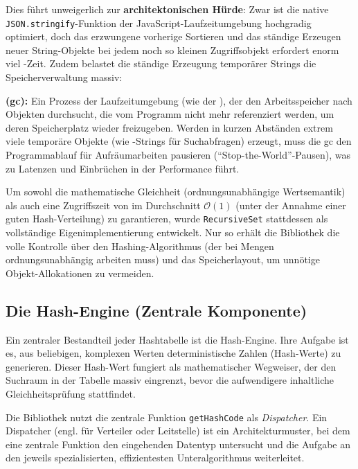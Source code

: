 Dies führt unweigerlich zur \textbf{architektonischen Hürde}: Zwar ist die native \texttt{JSON.stringify}-Funktion der JavaScript-Laufzeitumgebung hochgradig optimiert, doch das erzwungene vorherige Sortieren und das ständige Erzeugen neuer String-Objekte bei jedem noch so kleinen Zugriffsobjekt erfordert enorm viel -Zeit. Zudem belastet die ständige Erzeugung temporärer Strings die Speicherverwaltung massiv:

\begin{definition}
\label{def:garbage-collection}
\textbf{ (\gls{gc}):} Ein Prozess der Laufzeitumgebung (wie der ), der den Arbeitsspeicher nach Objekten durchsucht, die vom Programm nicht mehr referenziert werden, um deren Speicherplatz wieder freizugeben. Werden in kurzen Abständen extrem viele temporäre Objekte (wie -Strings für Suchabfragen) erzeugt, muss die \gls{gc} den Programmablauf für Aufräumarbeiten pausieren (\enquote{Stop-the-World}-Pausen), was zu Latenzen und Einbrüchen in der Performance führt.
\end{definition}

Um sowohl die mathematische Gleichheit (ordnungsunabhängige Wertsemantik) als auch eine Zugriffszeit von im Durchschnitt  $\mathcal{O}(1)$ (unter der Annahme einer guten Hash-Verteilung) zu garantieren, wurde \texttt{RecursiveSet} stattdessen als vollständige Eigenimplementierung entwickelt. Nur so erhält die Bibliothek die volle Kontrolle über den Hashing-Algorithmus (der bei Mengen ordnungsunabhängig arbeiten muss) und das Speicherlayout, um unnötige Objekt-Allokationen zu vermeiden.

\subsection{Die Hash-Engine (Zentrale Komponente)}
\label{subsec:rs-intern-hash-engine}

Ein zentraler Bestandteil jeder Hashtabelle ist die Hash-Engine. Ihre Aufgabe ist es, aus beliebigen, komplexen Werten deterministische Zahlen (Hash-Werte) zu generieren. Dieser Hash-Wert fungiert als mathematischer Wegweiser, der den Suchraum in der Tabelle massiv eingrenzt, bevor die aufwendigere inhaltliche Gleichheitsprüfung stattfindet.

Die Bibliothek nutzt die zentrale Funktion \texttt{getHashCode} als \textit{Dispatcher}. Ein Dispatcher (engl. für Verteiler oder Leitstelle) ist ein Architekturmuster, bei dem eine zentrale Funktion den eingehenden Datentyp untersucht und die Aufgabe an den jeweils spezialisierten, effizientesten Unteralgorithmus weiterleitet.

